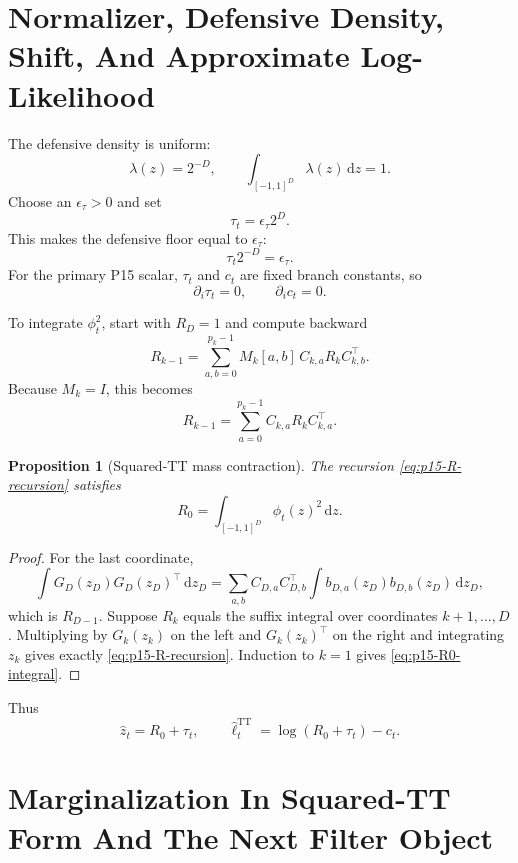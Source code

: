 \documentclass[11pt]{article}
\newcommand{\dd}{\mathrm{d}}
\newcommand{\TT}{\mathrm{TT}}
\newtheorem{proposition}{Proposition}
\theoremstyle{definition}
\theoremstyle{remark}
\renewcommand{\[}{\begin{equation}}
\renewcommand{\]}{\end{equation}}
\begin{document}
\section{Normalizer, Defensive Density, Shift, And Approximate Log-Likelihood}

The defensive density is uniform:
\[
  \lambda(z)=2^{-D},\qquad
  \int_{[-1,1]^D}\lambda(z)\,\dd z=1.
  \label{eq:p15-uniform-lambda}
\]
Choose an \(\epsilon_\tau>0\) and set
\[
  \tau_t=\epsilon_\tau 2^D.
  \label{eq:p15-tau}
\]
This makes the defensive floor equal to \(\epsilon_\tau\):
\[
  \tau_t 2^{-D}=\epsilon_\tau.
  \label{eq:p15-floor}
\]
For the primary P15 scalar, \(\tau_t\) and \(c_t\) are fixed branch constants,
so
\[
  \partial_i\tau_t=0,\qquad \partial_i c_t=0.
  \label{eq:p15-tau-c-derivatives}
\]

To integrate \(\phi_t^2\), start with \(R_D=1\) and compute backward
\[
  R_{k-1}
  =
  \sum_{a,b=0}^{p_k-1}
  M_k[a,b]\,
  C_{k,a}R_kC_{k,b}^{\top}.
  \label{eq:p15-R-recursion}
\]
Because \(M_k=I\), this becomes
\[
  R_{k-1}
  =
  \sum_{a=0}^{p_k-1}
  C_{k,a}R_kC_{k,a}^{\top}.
  \label{eq:p15-R-legendre}
\]

\begin{proposition}[Squared-TT mass contraction]
The recursion \eqref{eq:p15-R-recursion} satisfies
\[
  R_0=\int_{[-1,1]^D}\phi_t(z)^2\,\dd z.
  \label{eq:p15-R0-integral}
\]
\end{proposition}

\begin{proof}
For the last coordinate,
\[
  \int G_D(z_D)G_D(z_D)^\top\,\dd z_D
  =
  \sum_{a,b}C_{D,a}C_{D,b}^\top
  \int b_{D,a}(z_D)b_{D,b}(z_D)\,\dd z_D,
\]
which is \(R_{D-1}\).  Suppose \(R_k\) equals the suffix integral over
coordinates \(k+1,\ldots,D\).  Multiplying by \(G_k(z_k)\) on the left and
\(G_k(z_k)^\top\) on the right and integrating \(z_k\) gives exactly
\eqref{eq:p15-R-recursion}.  Induction to \(k=1\) gives
\eqref{eq:p15-R0-integral}.
\end{proof}

Thus
\[
  \widehat z_t=R_0+\tau_t,\qquad
  \widehat\ell_t^{\TT}=\log(R_0+\tau_t)-c_t.
  \label{eq:p15-step-ell}
\]

\section{Marginalization In Squared-TT Form And The Next Filter Object}
\end{document}
